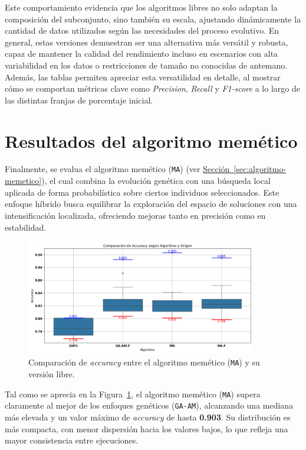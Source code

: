 Este comportamiento evidencia que los algoritmos libres no solo adaptan la composición del subconjunto, sino también su escala,
ajustando dinámicamente la cantidad de datos utilizados según las necesidades del proceso evolutivo.
En general, estas versiones demuestran ser una alternativa más versátil y robusta,
capaz de mantener la calidad del rendimiento incluso en escenarios con alta variabilidad en los datos o restricciones de tamaño no conocidas de antemano.
Además, las tablas permiten apreciar esta versatilidad en detalle, al mostrar cómo se comportan métricas clave como \textit{Precision},
\textit{Recall} y \textit{F1-score} a lo largo de las distintas franjas de porcentaje inicial.


\section{Resultados del algoritmo memético}\label{sec:resultados-algoritmo-memetico}
Finalmente, se evalua el algoritmo memético (\texttt{MA}) (ver \hyperref[sec:algoritmo-memetico]{Sección~\ref*{sec:algoritmo-memetico}}),
el cual combina la evolución genética con una búsqueda local aplicada de forma probabilística sobre ciertos individuos seleccionados.
Este enfoque híbrido busca equilibrar la exploración del espacio de soluciones con una intensificación localizada,
ofreciendo mejoras tanto en precisión como en estabilidad.


\begin{figure}[htp]
    \centering
    \includegraphics[width=0.9\textwidth]{imagenes/evaluaciones/comparacion-ma.png}
    \caption{Comparación de \textit{accuracy} entre el algoritmo memético (\texttt{MA}) y su versión libre.}
    \label{fig:memetico_comparacion}
\end{figure}

Tal como se aprecia en la Figura~\ref{fig:memetico_comparacion}, el algoritmo memético (\texttt{MA}) supera claramente al mejor de los enfoques genéticos
(\texttt{GA-AM}), alcanzando una mediana más elevada y un valor máximo de \textit{accuracy} de hasta \textbf{0.903}.
Su distribución es más compacta, con menor dispersión hacia los valores bajos, lo que refleja una mayor consistencia entre ejecuciones.

